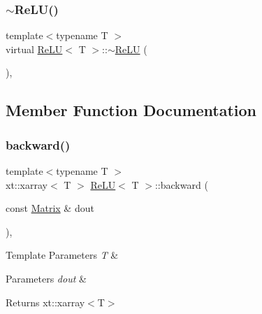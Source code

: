 \subsubsection{\texorpdfstring{$\sim$ReLU()}{~ReLU()}}
{\footnotesize\ttfamily template$<$typename T $>$ \\
virtual \mbox{\hyperlink{class_re_l_u}{Re\+LU}}$<$ T $>$\+::$\sim$\mbox{\hyperlink{class_re_l_u}{Re\+LU}} (\begin{DoxyParamCaption}{ }\end{DoxyParamCaption})\hspace{0.3cm}{\ttfamily [virtual]}, {\ttfamily [default]}}



\subsection{Member Function Documentation}
\mbox{\label{class_re_l_u_aa634f43909614b979d84f5d4e5480bb4}} 
\subsubsection{\texorpdfstring{backward()}{backward()}}
{\footnotesize\ttfamily template$<$typename T $>$ \\
xt\+::xarray$<$ T $>$ \mbox{\hyperlink{class_re_l_u}{Re\+LU}}$<$ T $>$\+::backward (\begin{DoxyParamCaption}\item[{const \mbox{\hyperlink{class_re_l_u_a3d1448f06335a4ab7227ec31a43a410f}{Matrix}} \&}]{dout }\end{DoxyParamCaption})\hspace{0.3cm}{\ttfamily [override]}, {\ttfamily [virtual]}}


\begin{DoxyTemplParams}{Template Parameters}
{\em T} & \\
\hline
\end{DoxyTemplParams}

\begin{DoxyParams}{Parameters}
{\em dout} & \\
\hline
\end{DoxyParams}
\begin{DoxyReturn}{Returns}
xt\+::xarray$<$\+T$>$ 
\end{DoxyReturn}


